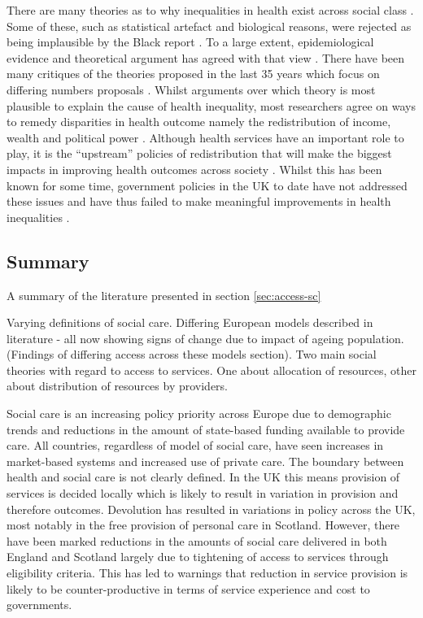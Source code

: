 \documentclass[12pt,]{report}
\begin{document}
There are many theories as to why inequalities in health exist across
social class \citep{RN327, RN333}. Some of these, such as statistical
artefact and biological reasons, were rejected as being implausible by
the Black report \citep{RN277}. To a large extent, epidemiological
evidence and theoretical argument has agreed with that view
\citep{RN327, RN83, RN82, RN333}. There have been many critiques of the
theories proposed in the last 35 years which focus on differing numbers
proposals \citep{RN327, RN333, RN377, RN378, RN83}. Whilst arguments
over which theory is most plausible to explain the cause of health
inequality, most researchers agree on ways to remedy disparities in
health outcome namely the redistribution of income, wealth and political
power \citep{RN378, RN391, RN327, RN333}. Although health services have
an important role to play, it is the ``upstream'' policies of
redistribution that will make the biggest impacts in improving health
outcomes across society \citep{RN378, RN391, RN327, RN325}. Whilst this
has been known for some time, government policies in the UK to date have
not addressed these issues and have thus failed to make meaningful
improvements in health inequalities \citep{RN330, RN331, RN377}.

\subsection{Summary}\label{subsec:access-sc-summary}

A summary of the literature presented in section \ref{sec:access-sc}

Varying definitions of social care. Differing European models described
in literature - all now showing signs of change due to impact of ageing
population. (Findings of differing access across these models section).
Two main social theories with regard to access to services. One about
allocation of resources, other about distribution of resources by
providers.

Social care is an increasing policy priority across Europe due to
demographic trends and reductions in the amount of state-based funding
available to provide care. All countries, regardless of model of social
care, have seen increases in market-based systems and increased use of
private care. The boundary between health and social care is not clearly
defined. In the UK this means provision of services is decided locally
which is likely to result in variation in provision and therefore
outcomes. Devolution has resulted in variations in policy across the UK,
most notably in the free provision of personal care in Scotland.
However, there have been marked reductions in the amounts of social care
delivered in both England and Scotland largely due to tightening of
access to services through eligibility criteria. This has led to
warnings that reduction in service provision is likely to be
counter-productive in terms of service experience and cost to
governments.
\end{document}

